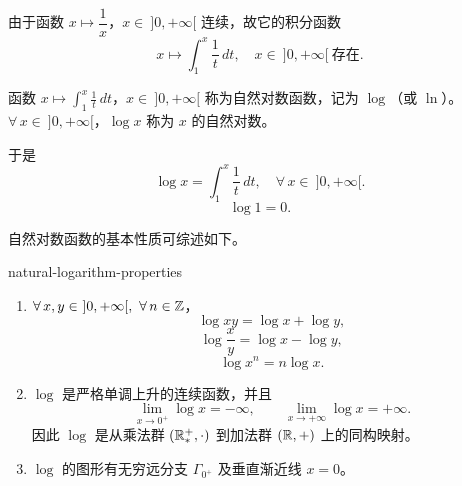 由于函数 \(x\longmapsto\dfrac1x\)，\(x\in\ ]0,+\infty[\) 连续，故它的积分函数
\[
x\longmapsto\int_1^x\frac1t\,dt,\quad x\in\ ]0,+\infty[\ \text{存在}.
\]

\begin{mydef*}{}

	函数 \(x\longmapsto\displaystyle\int_1^x\frac1t\,dt\)，\(x\in\ ]0,+\infty[\) 称为自然对数函数，记为 \(\log\)（或 \(\ln\)）。\(\forall\,x\in\ ]0,+\infty[\)，\(\log x\) 称为 \(x\) 的自然对数。

\end{mydef*}

于是
\[
\log x=\int_1^x\frac1t\,dt,\quad\forall\,x\in\ ]0,+\infty[.
\]
\[
\log 1=0.
\]

自然对数函数的基本性质可综述如下。

\begin{mythm}{}{natural-logarithm-properties}

	\begin{enumerate}[label=\arabic*)]
		\item \(\forall\,x,y\in\ ]0,+\infty[,\ \forall\,n\in\Z\)，
		\[
		\log xy=\log x+\log y,
		\]
		\[
		\log\frac xy=\log x-\log y,
		\]
		\[
		\log x^n=n\log x.
		\]

		\item \(\log\) 是严格单调上升的连续函数，并且
		\[
		\lim_{x\to0^+}\log x=-\infty,\qquad\lim_{x\to+\infty}\log x=+\infty.
		\]
		因此 \(\log\) 是从乘法群 \((\mathbb{R}_*^+,\cdot)\) 到加法群 \((\mathbb{R},+)\) 上的同构映射。

		\item \(\log\) 的图形有无穷远分支 \(\Gamma_{0^+}\) 及垂直渐近线 \(x=0\)。
	\end{enumerate}

\end{mythm}

